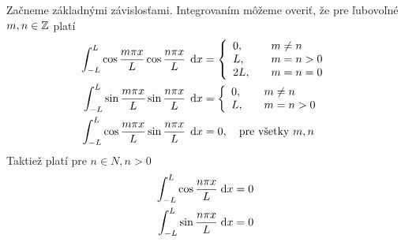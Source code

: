 Začneme základnými závislosťami. Integrovaním môžeme overiť, že pre
ľubovoľné $m,n \in \mathbb{Z}$ platí
\begin{equation}
\begin{split}
     \int_{-L}^{L} \cos \frac{m \pi x}{L} 
     \cos\frac{n \pi x}{L}\, \; \mathrm{d} x &= 
     \left\{
        \begin{array}{l l}
            0,& \quad m\not=n \\
            L,& \quad m=n>0 \\
            2L,& \quad m=n=0
        \end{array}
     \right. \\
     \int_{-L}^{L} \sin \frac{m \pi x}{L} 
     \sin\frac{n \pi x}{L}\, \; \mathrm{d} x &= 
     \left\{
        \begin{array}{l l}
            0,& \quad m\not=n \\
            L,& \quad m=n > 0
        \end{array}    
     \right. \\
     \int_{-L}^{L} \cos \frac{m \pi x}{L}
     \sin \frac{n \pi x}{L}\, \; \mathrm{d} x &= 0,
        \quad \text{pre všetky } m,n
        \label{eq:basic_orthogonality}
\end{split}
\end{equation}
Taktiež platí pre $n \in N, n>0$
\begin{equation}
\begin{split}
     \int_{-L}^{L} \cos \frac{n \pi x}{L} \; \mathrm{d} x = {}& 0\\
     \int_{-L}^{L} \sin \frac{n \pi x}{L} \; \mathrm{d} x = {}& 0 
    \label{eq:harmonic_integrals}
\end{split}    
\end{equation}


